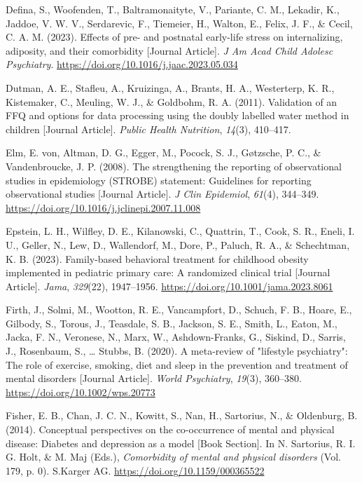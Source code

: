 \documentclass[
  letterpaper,
  DIV=11,
  numbers=noendperiod]{scrreport}
\newlength{\cslhangindent}
\newenvironment{CSLReferences}[2] %
 {\begin{list}{}{%
  \setlength{\itemindent}{0pt}
  \setlength{\leftmargin}{0pt}
  \setlength{\parsep}{0pt}
  \ifodd #1
   \setlength{\leftmargin}{\cslhangindent}
   \setlength{\itemindent}{-1\cslhangindent}
  \fi
  \setlength{\itemsep}{#2\baselineskip}}}
 {\end{list}}
\begin{document}
\begin{CSLReferences}{1}{0}
Defina, S., Woofenden, T., Baltramonaityte, V., Pariante, C. M.,
Lekadir, K., Jaddoe, V. W. V., Serdarevic, F., Tiemeier, H., Walton, E.,
Felix, J. F., \& Cecil, C. A. M. (2023). Effects of pre- and postnatal
early-life stress on internalizing, adiposity, and their comorbidity
{[}Journal Article{]}. \emph{J Am Acad Child Adolesc Psychiatry}.
\url{https://doi.org/10.1016/j.jaac.2023.05.034}

Dutman, A. E., Stafleu, A., Kruizinga, A., Brants, H. A., Westerterp, K.
R., Kistemaker, C., Meuling, W. J., \& Goldbohm, R. A. (2011).
Validation of an FFQ and options for data processing using the doubly
labelled water method in children {[}Journal Article{]}. \emph{Public
Health Nutrition}, \emph{14}(3), 410--417.

Elm, E. von, Altman, D. G., Egger, M., Pocock, S. J., Gøtzsche, P. C.,
\& Vandenbroucke, J. P. (2008). The strengthening the reporting of
observational studies in epidemiology (STROBE) statement: Guidelines for
reporting observational studies {[}Journal Article{]}. \emph{J Clin
Epidemiol}, \emph{61}(4), 344--349.
\url{https://doi.org/10.1016/j.jclinepi.2007.11.008}

Epstein, L. H., Wilfley, D. E., Kilanowski, C., Quattrin, T., Cook, S.
R., Eneli, I. U., Geller, N., Lew, D., Wallendorf, M., Dore, P., Paluch,
R. A., \& Schechtman, K. B. (2023). Family-based behavioral treatment
for childhood obesity implemented in pediatric primary care: A
randomized clinical trial {[}Journal Article{]}. \emph{Jama},
\emph{329}(22), 1947--1956. \url{https://doi.org/10.1001/jama.2023.8061}

Firth, J., Solmi, M., Wootton, R. E., Vancampfort, D., Schuch, F. B.,
Hoare, E., Gilbody, S., Torous, J., Teasdale, S. B., Jackson, S. E.,
Smith, L., Eaton, M., Jacka, F. N., Veronese, N., Marx, W.,
Ashdown-Franks, G., Siskind, D., Sarris, J., Rosenbaum, S., \ldots{}
Stubbs, B. (2020). A meta-review of "lifestyle psychiatry": The role of
exercise, smoking, diet and sleep in the prevention and treatment of
mental disorders {[}Journal Article{]}. \emph{World Psychiatry},
\emph{19}(3), 360--380. \url{https://doi.org/10.1002/wps.20773}

Fisher, E. B., Chan, J. C. N., Kowitt, S., Nan, H., Sartorius, N., \&
Oldenburg, B. (2014). Conceptual perspectives on the co-occurrence of
mental and physical disease: Diabetes and depression as a model {[}Book
Section{]}. In N. Sartorius, R. I. G. Holt, \& M. Maj (Eds.),
\emph{Comorbidity of mental and physical disorders} (Vol. 179, p. 0).
S.Karger AG. \url{https://doi.org/10.1159/000365522}


\end{CSLReferences}
\end{document}
